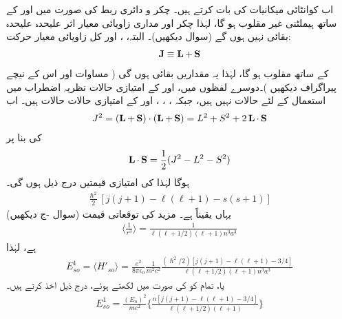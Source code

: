  اب کوانٹائی میکانیات کی بات کرتے ہیں۔ چکر و دائری ربط کی صورت میں  اور  کے ساتھ ہیملٹنی غیر مقلوب ہو گا، لہٰذا چکر اور مداری زاویائی معیار اثر علیحدہ علیحدہ بقائی نہیں ہوں گے (سوال  دیکھیں)۔ البتہ، ،  اور کل زاویائی معیار حرکت:
\begin{align}\label{مساوات_غیر_مضطرب_ایل_جمع_ایس_برابر_جے}
\operatorname{\mathbf{J}} \equiv \operatorname{\mathbf{L}} + \operatorname{\mathbf{S}}
\end{align}
کے ساتھ  مقلوب ہو گا، لہٰذا یہ مقداریں بقائی ہوں گی ( مساوات  اور اس کے نیچے پیراگراف دیکھیں )۔دوسرے لفظوں میں،  اور  کے امتیازی حالات نظریہ اضطراب میں استعمال کے لئے  حالات نہیں ہیں، جبکہ ، ، ، اور  کے امتیازی حالات  حالات ہیں۔ اب 
\begin{align*}
J^2 = (\operatorname{\mathbf{L}} + \operatorname{\mathbf{S}}) \cdot (\operatorname{\mathbf{L}} + \operatorname{\mathbf{S}}) = L^2 + S^2 + 2 \operatorname{\mathbf{L}} \cdot \operatorname{\mathbf{S}}
\end{align*}
کی بنا پر 
\begin{align}
\operatorname{\mathbf{L}} \cdot \operatorname{\mathbf{S}} = \frac{1}{2} (J^2 - L^2 - S^2)
\end{align}
ہوگا لہٰذا  کی امتیازی  قیمتیں  درج ذیل ہوں گی۔
\begin{align*}
\frac{\hslash^2}{2} [j (j + 1) - \ell (\ell + 1) - s(s + 1)]
\end{align*}
یہاں یقیناً  ہے۔ مزید  کی توقعاتی قیمت (سوال -ج دیکھیں) 
\begin{align}\label{مساوات_غیر_مضطرب_آر_تین}
\big\langle \frac{1}{r^3} \big\rangle = \frac{1}{\ell (\ell + 1/2) (\ell + 1) n^3 a^3} 
\end{align}
 ہے، لہٰذا 
\begin{align*}
E_{so}^1 = \langle H'_{so} \rangle = \frac{e^2}{8 \pi \epsilon_0} \frac{1}{m^2 c^2} \frac{(\hslash^2 /2) [j(j + 1) - \ell (\ell + 1) - 3/4]}{\ell (\ell + 1/2)(\ell + 1)n^3 a^3}
\end{align*} 
 یا، تمام کو  کی صورت میں لکھتے ہوئے، درج ذیل اخذ کرتے ہیں۔ 
\begin{align}\label{مساوات_غیر_مضطرب_چکر_و_مدار_ربط}
E^1_{so} = \frac{(E_n)^2}{mc^2} \Big \{ \frac{n[j(j + 1) - \ell (\ell + 1) - 3/4]}{\ell (\ell + 1/2)(\ell + 1)} \Big \}
\end{align}


